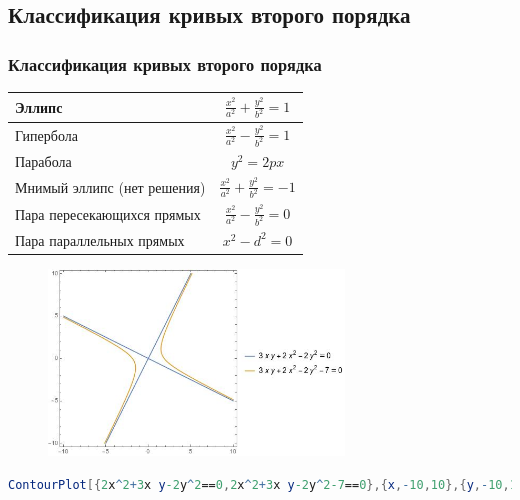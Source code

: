\documentclass[10pt]{beamer}
\begin{document}
    \subsection{Классификация кривых второго порядка}
    \begin{frame}
        \frametitle{Классификация кривых второго порядка}
        \begin{center}
            \begin{tabular}{|l|c|}
                \hline
                Эллипс & $ \frac{x^2}{a^2} + \frac{y^2}{b^2} = 1$ \\
                \hline
                Гипербола & $ \frac{x^2}{a^2} - \frac{y^2}{b^2} = 1$ \\
                \hline
                Парабола & $ y^2 = 2px $ \\
                \hline
                Мнимый эллипс (нет решения) & $ \frac{x^2}{a^2} + \frac{y^2}{b^2} = -1$ \\
                \hline
                Пара пересекающихся прямых & $ \frac{x^2}{a^2} - \frac{y^2}{b^2} = 0$ \\
                \hline
                Пара параллельных прямых & $ x^2 - d^2 = 0$ \\
                \hline
            \end{tabular}
        \end{center}
    \end{frame}

    \begin{frame}[fragile]
        \begin{figure}
            \includegraphics[width=0.7\textwidth]{classification.jpg}
        \end{figure}
        \begin{lstlisting}[language=Mathematica]
            ContourPlot[{2x^2+3x y-2y^2==0,2x^2+3x y-2y^2-7==0},{x,-10,10},{y,-10,10},PlotLegends->"Expressions"]
        \end{lstlisting}
    \end{frame}
\end{document}
